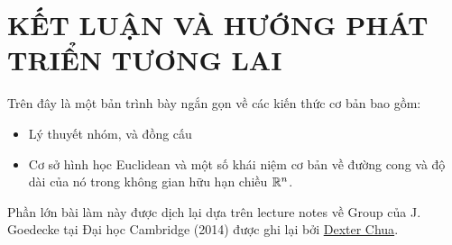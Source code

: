 \chapter{KẾT LUẬN VÀ HƯỚNG PHÁT TRIỂN TƯƠNG LAI}

Trên đây là một bản trình bày ngắn gọn về các kiến thức cơ bản bao gồm:
\begin{itemize}
    \item Lý thuyết nhóm, và đồng cấu
    \item Cơ sở hình học Euclidean và một số khái niệm cơ bản về đường cong và độ dài của nó trong không gian hữu hạn chiều $\mathbb{R}^n$.
\end{itemize}
Phần lớn bài làm này được dịch lại dựa trên lecture notes về Group của J. Goedecke tại Đại học Cambridge (2014) được ghi lại bởi \href{https://dec41.user.srcf.net/}{Dexter Chua}.











